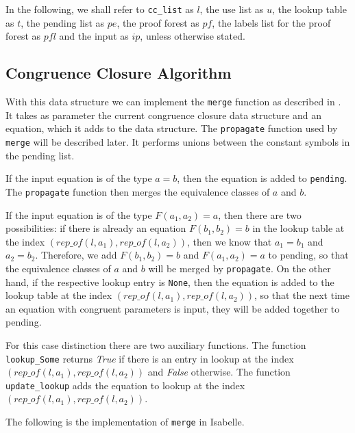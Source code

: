 In the following, we shall refer to \lstinline{cc_list} as $l$, the use list as $u$, the lookup table as $t$, the pending list as $pe$, the proof forest as $pf$, the labels list for the proof forest as $pfl$ and the input as $ip$, unless otherwise stated.

\subsection{Congruence Closure Algorithm}

With this data structure we can implement the \lstinline{merge} function as described in \cite{Nieuwenhuis}.
It takes as parameter the current congruence closure data structure and an equation, which it adds to the data structure. The \lstinline{propagate} function used by \lstinline{merge} will be described later. It performs unions between the constant symbols in the pending list.

If the input equation is of the type $a = b$, then the equation is added to \lstinline|pending|. The \lstinline|propagate| function then merges the equivalence classes of $a$ and $b$.

If the input equation is of the type $F(a_1, a_2) = a$, then there are two possibilities: if there is already an equation $F(b_1, b_2) = b$ in the lookup table at the index $(rep\_of(l,a_1), rep\_of(l,a_2))$, then we know that $a_1 = b_1$ and $a_2 = b_2$. Therefore, we add $F(b_1, b_2) = b$ and $F(a_1, a_2) = a$ to pending, so that the equivalence classes of $a$ and $b$ will be merged by \lstinline|propagate|.
On the other hand, if the respective lookup entry is \lstinline{None}, then the equation is added to the lookup table at the index $(rep\_of(l,a_1), rep\_of(l,a_2))$, so that the next time an equation with congruent parameters is input, they will be added together to pending.

For this case distinction there are two auxiliary functions.
The function \lstinline{lookup_Some} returns \emph{True} if there is an entry in lookup at the index $(rep\_of(l,a_1), rep\_of(l,a_2))$ and \emph{False} otherwise. The function \lstinline{update_lookup} adds the equation to lookup at the index $(rep\_of(l,a_1), rep\_of(l,a_2))$.

The following is the implementation of \lstinline|merge| in Isabelle.


